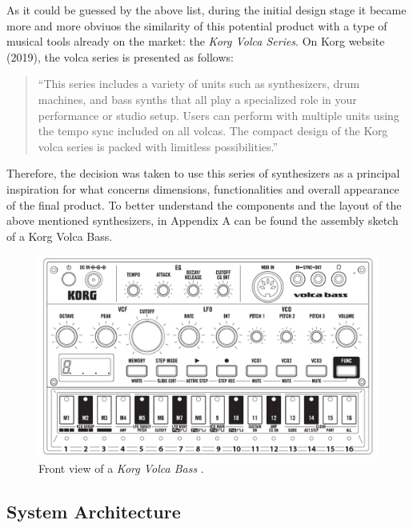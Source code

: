 \documentclass[]{article}
\begin{document}
            As it could be guessed by the above list, during the initial design stage it became more and more obviuos the similarity of this potential product with a 
            type of musical tools already on the market: the \emph{Korg Volca Series}. On Korg website (2019), the volca series is presented as follows: \\
            \begin{quote}
                ``This series includes a variety of units such as synthesizers, drum machines, and bass synths that 
                all play a specialized role in your performance or studio setup. Users can perform with multiple units using the tempo sync 
                included on all volcas. The compact design of the Korg volca series 
                is packed with limitless possibilities.'' \cite{KORG2019}
            \end{quote}

            Therefore, the decision was taken to use this series of synthesizers as a principal inspiration for what 
            concerns dimensions, functionalities and overall appearance of the final product. To better understand the 
            components and the layout of the above mentioned synthesizers, in Appendix A can be found the assembly sketch of a Korg Volca Bass.

            \begin{figure}[h]
                \centering
                \includegraphics[width=\textwidth]{korg-volca-bass.png}
                \caption{Front view of a \emph{Korg Volca Bass} \cite{KORG2013}.}
                \label{fig:volcabass}
                
            \end{figure}

    \subsection{System Architecture}
\end{document}
